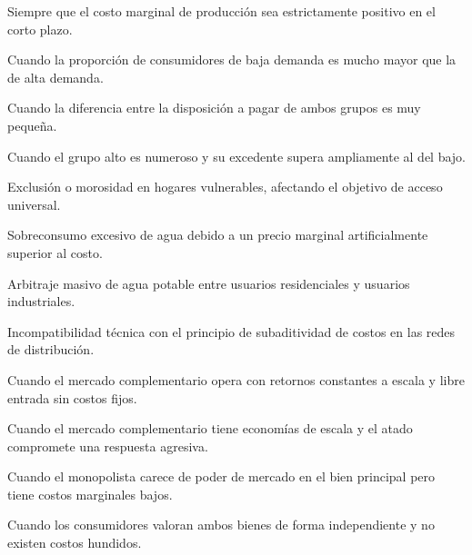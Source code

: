 \begin{opts}
    \item Siempre que el costo marginal de producción sea estrictamente positivo en el corto plazo.
    \item Cuando la proporción de consumidores de baja demanda es mucho mayor que la de alta demanda.
    \item Cuando la diferencia entre la disposición a pagar de ambos grupos es muy pequeña.
    \item Cuando el grupo alto es numeroso y su excedente supera ampliamente al del bajo.
\end{opts}

\begin{opts}
    \item Exclusión o morosidad en hogares vulnerables, afectando el objetivo de acceso universal.
    \item Sobreconsumo excesivo de agua debido a un precio marginal artificialmente superior al costo.
    \item Arbitraje masivo de agua potable entre usuarios residenciales y usuarios industriales.
    \item Incompatibilidad técnica con el principio de subaditividad de costos en las redes de distribución.
\end{opts}

\begin{opts}
    \item Cuando el mercado complementario opera con retornos constantes a escala y libre entrada sin costos fijos.
    \item Cuando el mercado complementario tiene economías de escala y el atado compromete una respuesta agresiva.
    \item Cuando el monopolista carece de poder de mercado en el bien principal pero tiene costos marginales bajos.
    \item Cuando los consumidores valoran ambos bienes de forma independiente y no existen costos hundidos.
\end{opts}

